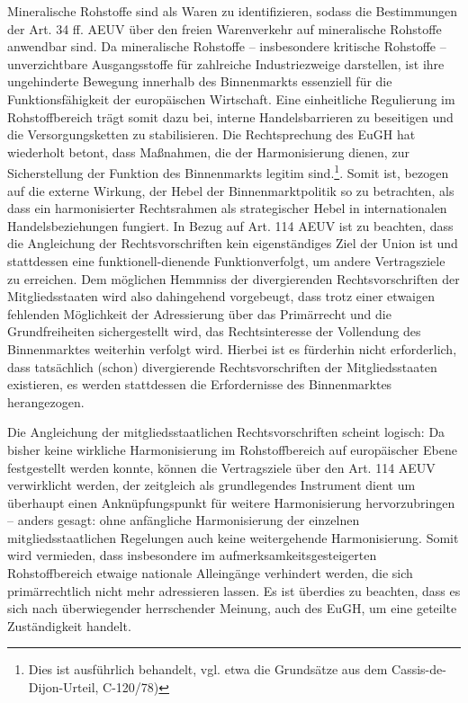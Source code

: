 \documentclass[12pt,a4paper,oneside]{book} %
\begin{document}
Mineralische Rohstoffe sind als Waren zu identifizieren, sodass die Bestimmungen der Art. 34 ff. AEUV über den freien Warenverkehr auf mineralische Rohstoffe anwendbar sind. Da mineralische Rohstoffe – insbesondere kritische Rohstoffe – unverzichtbare Ausgangsstoffe für zahlreiche Industriezweige darstellen, ist ihre ungehinderte Bewegung innerhalb des Binnenmarkts essenziell für die Funktionsfähigkeit der europäischen Wirtschaft. Eine einheitliche Regulierung im Rohstoffbereich trägt somit dazu bei, interne Handelsbarrieren zu beseitigen und die Versorgungsketten zu stabilisieren. Die Rechtsprechung des EuGH hat wiederholt betont, dass Maßnahmen, die der Harmonisierung dienen, zur Sicherstellung der Funktion des Binnenmarkts legitim sind.\footnote{Dies ist ausführlich behandelt, vgl. etwa die Grundsätze aus dem Cassis-de-Dijon-Urteil, C-120/78)}. Somit ist, bezogen auf die externe Wirkung, der Hebel der Binnenmarktpolitik so zu betrachten, als dass ein harmonisierter Rechtsrahmen als strategischer Hebel in internationalen Handelsbeziehungen fungiert.
In Bezug auf Art. 114 AEUV ist zu beachten, dass die Angleichung der Rechtsvorschriften kein eigenständiges Ziel der Union ist und stattdessen eine \glqq funktionell-dienende Funktion\grqq verfolgt, um andere Vertragsziele zu erreichen.\autocites{Streinz, EUV/AEUV Art. 114, Rn. 5}{Calliess/Ruffert, EUV/AEUV, Art. 114, Rn. 2}{Grabitz/Hilf/Nettesheim/Tietje, 83. EL Juli 2024, AEUV Art. 114 Rn. 6} Dem möglichen Hemmniss der divergierenden Rechtsvorschriften der Mitgliedsstaaten wird also dahingehend vorgebeugt, dass trotz einer etwaigen fehlenden Möglichkeit der Adressierung über das Primärrecht und die Grundfreiheiten sichergestellt wird, das Rechtsinteresse der Vollendung des Binnenmarktes weiterhin verfolgt wird.\autocite{Streinz, EUV/AEUV Art. 114, Rn. 5f.} Hierbei ist es fürderhin nicht erforderlich, dass tatsächlich (schon) divergierende Rechtsvorschriften der Mitgliedsstaaten existieren, es werden stattdessen die Erfordernisse des Binnenmarktes herangezogen.\autocite{Streinz/M. Schröder AEUV Art. 114 Rn. 40}

Die Angleichung der mitgliedsstaatlichen Rechtsvorschriften scheint logisch: Da bisher keine wirkliche Harmonisierung im Rohstoffbereich auf europäischer Ebene festgestellt werden konnte, können die Vertragsziele über den Art. 114 AEUV verwirklicht werden, der zeitgleich als grundlegendes Instrument dient um überhaupt einen Anknüpfungspunkt für weitere Harmonisierung hervorzubringen -- anders gesagt: ohne anfängliche Harmonisierung der einzelnen mitgliedsstaatlichen Regelungen auch keine weitergehende Harmonisierung. Somit wird vermieden, dass insbesondere im aufmerksamkeitsgesteigerten Rohstoffbereich etwaige nationale Alleingänge verhindert werden, die sich primärrechtlich nicht mehr adressieren lassen.\autocite{Streinz, EUV/AEUV Art. 114, Rn. 6} Es ist überdies zu beachten, dass es sich nach überwiegender herrschender Meinung, auch des EuGH, um eine geteilte Zuständigkeit handelt.\autocites{Streinz, EUV/AEUV Art. 114, Rn. 7}{Calliess/Ruffert, EUV/AEUV, Art. 114, Rn. 8}
\end{document}
